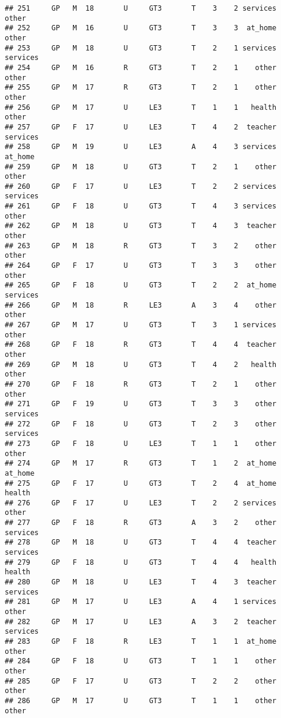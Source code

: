 \documentclass[
]{article}
\begin{document}
\begin{verbatim}
## 251     GP   M  18       U     GT3       T    3    2 services    other
## 252     GP   M  16       U     GT3       T    3    3  at_home    other
## 253     GP   M  18       U     GT3       T    2    1 services services
## 254     GP   M  16       R     GT3       T    2    1    other    other
## 255     GP   M  17       R     GT3       T    2    1    other    other
## 256     GP   M  17       U     LE3       T    1    1   health    other
## 257     GP   F  17       U     LE3       T    4    2  teacher services
## 258     GP   M  19       U     LE3       A    4    3 services  at_home
## 259     GP   M  18       U     GT3       T    2    1    other    other
## 260     GP   F  17       U     LE3       T    2    2 services services
## 261     GP   F  18       U     GT3       T    4    3 services    other
## 262     GP   M  18       U     GT3       T    4    3  teacher    other
## 263     GP   M  18       R     GT3       T    3    2    other    other
## 264     GP   F  17       U     GT3       T    3    3    other    other
## 265     GP   F  18       U     GT3       T    2    2  at_home services
## 266     GP   M  18       R     LE3       A    3    4    other    other
## 267     GP   M  17       U     GT3       T    3    1 services    other
## 268     GP   F  18       R     GT3       T    4    4  teacher    other
## 269     GP   M  18       U     GT3       T    4    2   health    other
## 270     GP   F  18       R     GT3       T    2    1    other    other
## 271     GP   F  19       U     GT3       T    3    3    other services
## 272     GP   F  18       U     GT3       T    2    3    other services
## 273     GP   F  18       U     LE3       T    1    1    other    other
## 274     GP   M  17       R     GT3       T    1    2  at_home  at_home
## 275     GP   F  17       U     GT3       T    2    4  at_home   health
## 276     GP   F  17       U     LE3       T    2    2 services    other
## 277     GP   F  18       R     GT3       A    3    2    other services
## 278     GP   M  18       U     GT3       T    4    4  teacher services
## 279     GP   F  18       U     GT3       T    4    4   health   health
## 280     GP   M  18       U     LE3       T    4    3  teacher services
## 281     GP   M  17       U     LE3       A    4    1 services    other
## 282     GP   M  17       U     LE3       A    3    2  teacher services
## 283     GP   F  18       R     LE3       T    1    1  at_home    other
## 284     GP   F  18       U     GT3       T    1    1    other    other
## 285     GP   F  17       U     GT3       T    2    2    other    other
## 286     GP   M  17       U     GT3       T    1    1    other    other

\end{verbatim}
\end{document}
